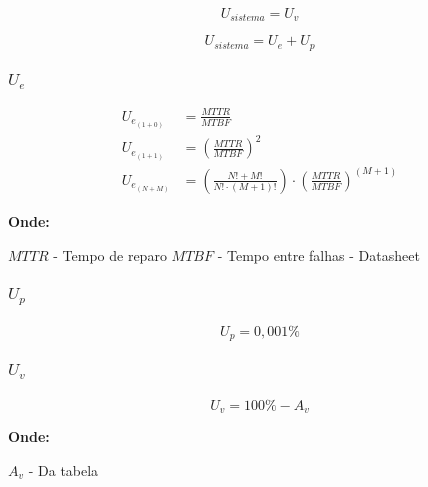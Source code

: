 \documentclass[11pt]{article} %
\begin{document}
\begin{equation}
U_{sistema} = U_{v}
\end{equation}

\begin{equation}
U_{sistema} = U_{e} + U_{p}
\end{equation}

\subsubsection{$U_{e}$}

\begin{subequations}
\begin{align}
{U}_{e_{(1 + 0)}} & = \frac{MTTR}{MTBF}\\
{U}_{e_{(1 + 1)}} & = \left ( \frac{MTTR}{MTBF} \right ) ^ 2 \\
{U}_{e_{(N + M)}} & = \left ( \frac{N! + M!}{N! \cdot (M + 1)!} \right ) \cdot \left ( \frac{MTTR}{MTBF} \right ) ^{(M + 1)}
\end{align}
\end{subequations}

\textbf{Onde:}

$MTTR$ - Tempo de reparo \newline
$MTBF$ - Tempo entre falhas - Datasheet

\subsubsection{$U_{p}$}

\paragraph{}

\begin{equation}
U_{p} = 0,001\%
\end{equation}

\subsubsection{$U_{v}$}

\paragraph{}

\begin{equation}
U_{v} = 100\% - A_{v}
\end{equation}

\textbf{Onde:}

$A_{v}$ - Da tabela
\end{document}
